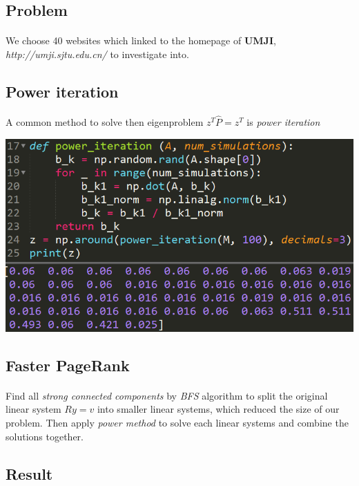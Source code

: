 \documentclass[a0,portrait]{a0poster}
\begin{document}
\begin{multicols}{2}
\color{purple}
\section*{Problem}
\paragraph{}
   We choose 40 websites which linked to the homepage of \textbf{UMJI}, \textit{http://umji.sjtu.edu.cn/} to investigate into.
   \subsection*{Power iteration}
   \paragraph{}
   A common method to solve then eigenproblem $z^{T}\hat{P} = z^T$ is \textit{power iteration}\\
  \begin{minipage}[H]{1\linewidth}
  	\centering
  	\includegraphics{result.PNG}
  	\label{Table 1}
  \end{minipage}
   \subsection*{Faster PageRank}
   \paragraph{}
   Find all \textit{strong connected components} by \textit{BFS} algorithm to split the original linear system $Ry=v$ into smaller linear systems, which reduced the size of our problem. Then apply \textit{power method} to solve each linear systems and combine the solutions together.
  \subsection*{Result}

\end{multicols}
\end{document}
